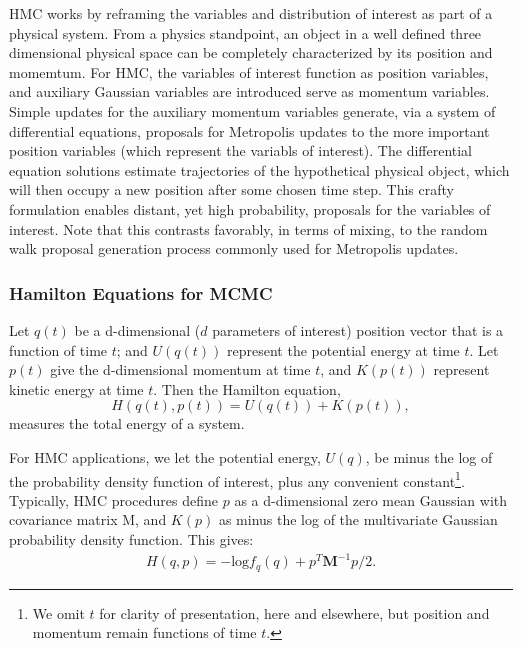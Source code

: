 \documentclass{article}
\begin{document}
HMC works by reframing the variables and distribution of interest as part of a physical system. From a physics standpoint, an object in a well defined three dimensional physical space can be completely characterized by its position and momemtum. For HMC, the variables of interest function as position variables, and auxiliary Gaussian variables are introduced serve as momentum variables. Simple updates for the auxiliary momentum variables generate, via a system of differential equations, proposals for Metropolis updates to the more important position variables (which represent the variabls of interest). The differential equation solutions estimate trajectories of the hypothetical physical object, which will then occupy a new position after some chosen time step. This crafty formulation enables distant, yet high probability, proposals for the variables of interest. Note that this contrasts favorably, in terms of mixing, to the random walk proposal generation process commonly used for Metropolis updates.

\subsubsection{Hamilton Equations for MCMC} %

Let $q(t)$ be a d-dimensional ($d$ parameters of interest) position vector that is a function of time $t$; and $U(q(t))$ represent the potential energy at time $t$. Let $p(t)$ give the d-dimensional momentum at time $t$, and $K(p(t))$ represent kinetic energy at time $t$. Then the Hamilton equation,
\begin{equation}
H(q(t),p(t)) = U(q(t)) + K(p(t)),
\end{equation}
measures the total energy of a system. 

For HMC applications, we let the potential energy, $U(q)$, be minus the log of the probability density function of interest, plus any convenient constant\footnote{We omit $t$ for clarity of presentation, here and elsewhere, but position and momentum remain functions of time $t$.}. Typically, HMC procedures define $p$ as a d-dimensional zero mean Gaussian with covariance matrix M, and $K(p)$ as minus the log of the multivariate Gaussian probability density function. This gives:
\begin{align}
H(q,p) = -\text{log}f_{q}(q) + p^{T}\pmb{M}^{-1}p/2.
\end{align}
\end{document}
